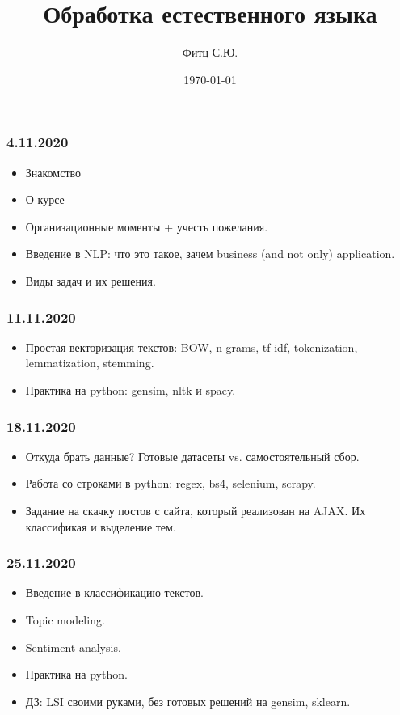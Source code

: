 \documentclass[a4paper,11pt]{article}
\author{Фитц С.Ю.}
\title{Обработка естественного языка}
\date{\today}
\begin{document}
	
\maketitle
 
\subsubsection{4.11.2020}
\begin{itemize}
	\item Знакомство 
	\item О курсе
	\item Организационные моменты + учесть пожелания.
	\item Введение в NLP: что это такое, зачем business (and not only) application. 
	\item Виды задач и их решения. 
\end{itemize}
\subsubsection{11.11.2020}
\begin{itemize}
	\item Простая векторизация текстов: BOW, n-grams, tf-idf, tokenization, lemmatization, stemming. 
	\item Практика на python: gensim, nltk и spacy.  
\end{itemize}
\subsubsection{18.11.2020}
\begin{itemize}
	\item Откуда брать данные? Готовые датасеты vs. самостоятельный сбор.
	\item Работа со строками в python: regex, bs4, selenium, scrapy.
	\item Задание на скачку постов с сайта, который реализован на AJAX. Их классификая и выделение тем. 
\end{itemize}
\subsubsection{25.11.2020}
\begin{itemize}
	\item Введение в классификацию текстов. 
	\item Topic modeling.
	\item Sentiment analysis.  
	\item Практика на python.
	\item ДЗ: LSI своими руками, без готовых решений на gensim, sklearn. 
\end{itemize}
\end{document}
